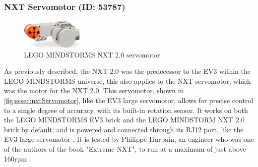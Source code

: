 \subsubsection{NXT Servomotor (ID: 53787)}
\begin{figure}[H]
  \centering
  \includegraphics[width=3cm]{images/techAnalysis/LegoNXT2Servomotor.jpg}
  \caption{LEGO MINDSTORMS NXT 2.0 servomotor \cite{BrickOWl-figure-NXT2-Servo}}\label{fig:sssec:nxtServomotor}
\end{figure}
As previously described, the NXT 2.0 was the predecessor to the EV3 within the LEGO MINDSTORMS universe, this also applies to the NXT servomotor, which was the motor for the NXT 2.0.
This servomotor, shown in \autoref{fig:sssec:nxtServomotor}, like the EV3 large servomotor, allows for precise control to a single degree of accuracy, with its built-in rotation sensor.
It works on both the LEGO MINDSTORMS EV3 brick and the LEGO MINDSTORM NXT 2.0 brick by default, and is powered and connected through its RJ12 port, like the EV3 large servomotor \cite{lego_lego_EV3NXTCompatibility}.
It is tested by Philippe Hurbain, an engineer who was one of the authors of the book "Extreme NXT", to run at a maximum of just above 160rpm \cite{gasperi_extreme_2009} \cite{hurbain_nxt_nodate}. \cite{lego_mindstorms_2009}
